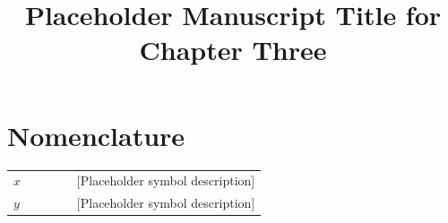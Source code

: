 \documentclass[../main.tex]{subfiles}
\title{Placeholder Manuscript Title for Chapter Three}
\affil{a}{Your Institute, Your Department, Your University, City, Country}
\begin{document}
\appendixfront

\section{Nomenclature}
\vspace{5mm}
{\renewcommand{\arraystretch}{0.92}
  \begin{tabular}{l p{0.75\linewidth}}
    \toprule
    $x$ & [Placeholder symbol description] \\
    $y$ & [Placeholder symbol description] \\
    \bottomrule
  \end{tabular}
\vspace{5mm}}



\end{document}
